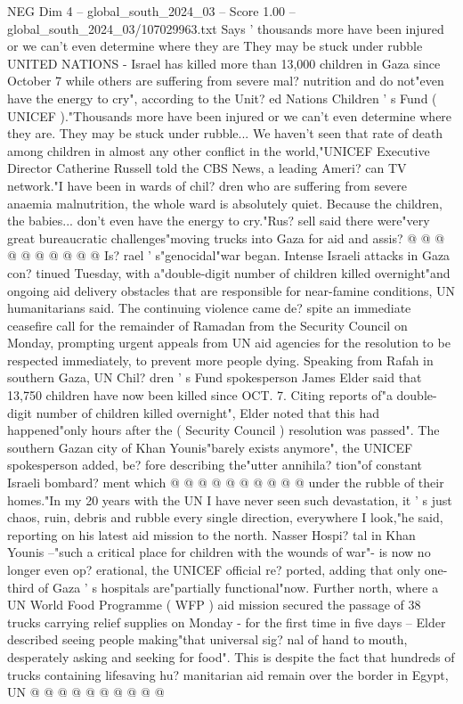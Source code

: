 \begin{textsample}{NEG Dim 4 – global\_south\_2024\_03 – Score 1.00 – global\_south\_2024\_03/107029963.txt}  \label{ex:f4_neg_356}
Says ' thousands more have been injured or we can't even determine where they are They may be stuck under rubble UNITED NATIONS - Israel has killed more than 13,000 children in Gaza since October 7 while others are suffering from severe mal? nutrition and do not"even have the energy to cry", according to the Unit? ed Nations Children ' s Fund ( UNICEF )."Thousands more have been injured or we can't even determine where they are.
They may be stuck under rubble...
We haven't seen that rate of death among children in almost any other conflict in the world,"UNICEF Executive Director Catherine Russell told the CBS News, a leading Ameri? can TV network."I have been in wards of chil? dren who are suffering from severe anaemia malnutrition, the whole ward is absolutely quiet.
Because the children, the babies... don't even have the energy to cry."Rus? sell said there were"very great bureaucratic challenges"moving trucks into Gaza for aid and assis? @ @ @ @ @ @ @ @ @ @ Is? rael ' s"genocidal"war began.
Intense Israeli attacks in Gaza con? tinued Tuesday, with a"double-digit number of children killed overnight"and ongoing aid delivery obstacles that are responsible for near-famine conditions, UN humanitarians said.
The continuing violence came de? spite an immediate ceasefire call for the remainder of Ramadan from the Security Council on Monday, prompting urgent appeals from UN aid agencies for the resolution to be respected immediately, to prevent more people dying.
Speaking from Rafah in southern Gaza, UN Chil? dren ' s Fund spokesperson James Elder said that 13,750 children have now been killed since OCT. 7.
Citing reports of"a double-digit number of children killed overnight", Elder noted that this had happened"only hours after the ( Security Council ) resolution was passed".
The southern Gazan city of Khan Younis"barely exists anymore", the UNICEF spokesperson added, be? fore describing the"utter annihila? tion"of constant Israeli bombard? ment which @ @ @ @ @ @ @ @ @ @ under the rubble of their homes."In my 20 years with the UN I have never seen such devastation, it ' s just chaos, ruin, debris and rubble every single direction, everywhere I look,"he said, reporting on his latest aid mission to the north.
Nasser Hospi? tal in Khan Younis --"such a critical place for children with the wounds of war"- is now no longer even op? erational, the UNICEF official re? ported, adding that only one-third of Gaza ' s hospitals are"partially functional"now.
Further north, where a UN World Food Programme ( WFP ) aid mission secured the passage of 38 trucks carrying relief supplies on Monday - for the first time in five days -- Elder described seeing people making"that universal sig? nal of hand to mouth, desperately asking and seeking for food".
This is despite the fact that hundreds of trucks containing lifesaving hu? manitarian aid remain over the border in Egypt, UN @ @ @ @ @ @ @ @ @ @

\end{textsample}
